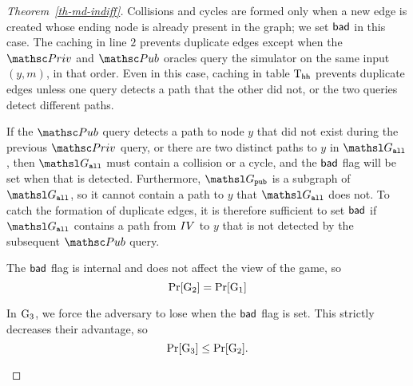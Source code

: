 \begin{proof}[Theorem~\ref{th-md-indiff}]
Collisions and cycles are formed only when a new edge is created whose ending node is already present in the graph;
we set $\mathsf{bad}$ in this case.
The caching in line $2$ prevents duplicate edges except when the $\PrivO$ and $\PubO$ oracles query the simulator on the same input $(y, m)$, in that order.
Even in this case, caching in table $\text{T}_{\mathsf{hh}}$ prevents duplicate edges unless one query detects a path that the other did not, or the two queries detect different paths.

If the $\PubO$ query detects a path to node $y$ that did not exist during the previous $\PrivO$ query, or there are two distinct paths to $y$ in $\graph_{\all}$, then $\graph_{\all}$ must contain a collision or a cycle, and the $\mathsf{bad}$ flag will be set when that is detected.
Furthermore, $\graph_{\public}$ is a subgraph of $\graph_{\all}$, so it cannot contain a path to $y$ that $\graph_{\all}$ does not.
To catch the formation of duplicate edges, it is therefore sufficient to set $\mathsf{bad}$ if $\graph_{\all}$ contains a path from $IV$ to $y$ that is not detected by the subsequent $\PubO$ query.

The $\mathsf{bad}$ flag is internal and does not affect the view of the game, so
\[\Pr[\textnormal{G}_2] = \Pr[\textnormal{G}_1] \]

In $\textnormal{G}_3$, we force the adversary to lose when the $\mathsf{bad}$ flag is set.
This strictly decreases their advantage, so
\[ \Pr[\textnormal{G}_3] \leq \Pr[\textnormal{G}_2]. \]

\begin{figure}
\end{figure}
\end{proof}
